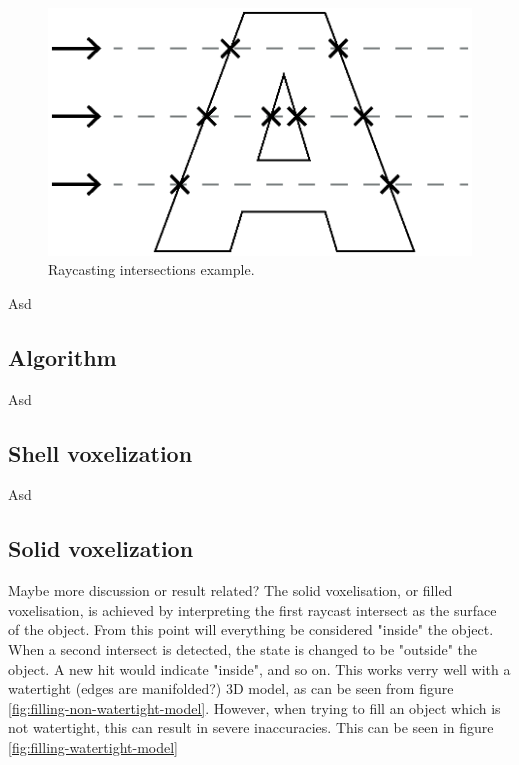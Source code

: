 \begin{figure}[h]
    \centering
    \includegraphics[scale=0.8]{sections/methodology/figures/raycast-intersections}
    \caption{Raycasting intersections example.}
    \label{fig:raycasting-intersections-example}
\end{figure}


Asd

\subsection{Algorithm}
Asd

\subsection{Shell voxelization}
Asd

\subsection{Solid voxelization}
\colorbox{RubineRed}{Maybe more discussion or result related?}
The solid voxelisation, or filled voxelisation, is achieved by interpreting the first raycast intersect as the surface of the object. From this point will everything be considered "inside" the object. When a second intersect is detected, the state is changed to be "outside" the object. A new hit would indicate "inside", and so on. This works verry well with a watertight (\colorbox{RubineRed}{edges are manifolded?}) 3D model, as can be seen from figure \ref{fig:filling-non-watertight-model}. However, when trying to fill an object which is not watertight, this can result in severe inaccuracies. This can be seen in figure \ref{fig:filling-watertight-model}

